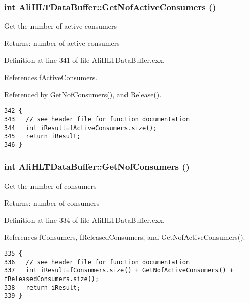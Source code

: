 \subsubsection{\setlength{\rightskip}{0pt plus 5cm}int Ali\-HLTData\-Buffer::Get\-Nof\-Active\-Consumers ()}\label{classAliHLTDataBuffer_a13}


Get the number of active consumers \begin{Desc}
\item[Returns:]number of active consumers \end{Desc}


Definition at line 341 of file Ali\-HLTData\-Buffer.cxx.

References f\-Active\-Consumers.

Referenced by Get\-Nof\-Consumers(), and Release().

\footnotesize\begin{verbatim}342 {
343   // see header file for function documentation
344   int iResult=fActiveConsumers.size();
345   return iResult;
346 }
\end{verbatim}\normalsize 


\subsubsection{\setlength{\rightskip}{0pt plus 5cm}int Ali\-HLTData\-Buffer::Get\-Nof\-Consumers ()}\label{classAliHLTDataBuffer_a12}


Get the number of consumers \begin{Desc}
\item[Returns:]number of consumers \end{Desc}


Definition at line 334 of file Ali\-HLTData\-Buffer.cxx.

References f\-Consumers, f\-Released\-Consumers, and Get\-Nof\-Active\-Consumers().

\footnotesize\begin{verbatim}335 {
336   // see header file for function documentation
337   int iResult=fConsumers.size() + GetNofActiveConsumers() + fReleasedConsumers.size();
338   return iResult;
339 }
\end{verbatim}\normalsize 



